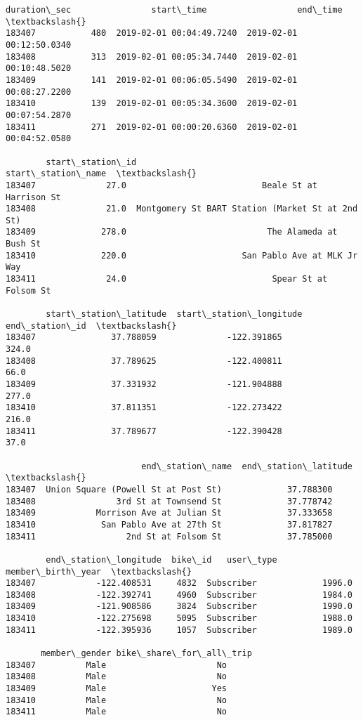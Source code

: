 \documentclass[11pt]{article}
\makeatletter
\newcommand{\boxspacing}{\kern\kvtcb@left@rule\kern\kvtcb@boxsep}
\newcommand{\prompt}[4]{
        {\ttfamily\llap{{\color{#2}[#3]:\hspace{3pt}#4}}\vspace{-\baselineskip}}
    }
\makeatother
\begin{document}
            \begin{tcolorbox}[breakable, size=fbox, boxrule=.5pt, pad at break*=1mm, opacityfill=0]
\prompt{Out}{outcolor}{4}{\boxspacing}
\begin{Verbatim}[commandchars=\\\{\}]
        duration\_sec                start\_time                  end\_time  \textbackslash{}
183407           480  2019-02-01 00:04:49.7240  2019-02-01 00:12:50.0340
183408           313  2019-02-01 00:05:34.7440  2019-02-01 00:10:48.5020
183409           141  2019-02-01 00:06:05.5490  2019-02-01 00:08:27.2200
183410           139  2019-02-01 00:05:34.3600  2019-02-01 00:07:54.2870
183411           271  2019-02-01 00:00:20.6360  2019-02-01 00:04:52.0580

        start\_station\_id                                start\_station\_name  \textbackslash{}
183407              27.0                           Beale St at Harrison St
183408              21.0  Montgomery St BART Station (Market St at 2nd St)
183409             278.0                            The Alameda at Bush St
183410             220.0                       San Pablo Ave at MLK Jr Way
183411              24.0                             Spear St at Folsom St

        start\_station\_latitude  start\_station\_longitude  end\_station\_id  \textbackslash{}
183407               37.788059              -122.391865           324.0
183408               37.789625              -122.400811            66.0
183409               37.331932              -121.904888           277.0
183410               37.811351              -122.273422           216.0
183411               37.789677              -122.390428            37.0

                           end\_station\_name  end\_station\_latitude  \textbackslash{}
183407  Union Square (Powell St at Post St)             37.788300
183408                3rd St at Townsend St             37.778742
183409            Morrison Ave at Julian St             37.333658
183410             San Pablo Ave at 27th St             37.817827
183411                  2nd St at Folsom St             37.785000

        end\_station\_longitude  bike\_id   user\_type  member\_birth\_year  \textbackslash{}
183407            -122.408531     4832  Subscriber             1996.0
183408            -122.392741     4960  Subscriber             1984.0
183409            -121.908586     3824  Subscriber             1990.0
183410            -122.275698     5095  Subscriber             1988.0
183411            -122.395936     1057  Subscriber             1989.0

       member\_gender bike\_share\_for\_all\_trip
183407          Male                      No
183408          Male                      No
183409          Male                     Yes
183410          Male                      No
183411          Male                      No
\end{Verbatim}
\end{tcolorbox}
        
\end{document}
